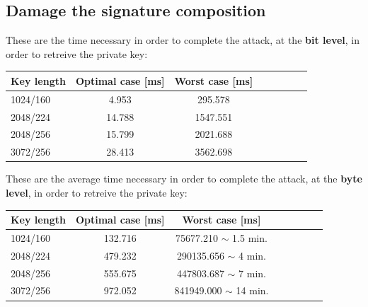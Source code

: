\documentclass[11pt,english]{article}
\begin{document}
\subsection{Damage the signature composition}

These are the time necessary in order to complete the attack, at the \textbf{bit level}, in order to retreive the private key:\\

\begin{center}
\begin{tabular}{l*{6}{c}r}
Key length        & Optimal case [ms] & Worst case [ms] \\
\hline
1024/160 &        4.953 & 295.578  \\
2048/224 &       14.788 & 1547.551  \\
2048/256 &       15.799 & 2021.688  \\
3072/256 &       28.413 & 3562.698 \\ 
\end{tabular}
\end{center}

These are the average time necessary in order to complete the attack, at the \textbf{byte level}, in order to retreive the private key:\\

\begin{center}
\begin{tabular}{l*{6}{c}r}
Key length        & Optimal case [ms] & Worst case [ms] \\
\hline
1024/160 &        132.716 & 75677.210  $\mathtt{\sim}$ 1.5 min.\\
2048/224 &        479.232 & 290135.656 $\mathtt{\sim}$ 4 min. \\
2048/256 &       555.675  & 447803.687 $\mathtt{\sim}$ 7 min.   \\
3072/256 &       972.052 & 841949.000 $\mathtt{\sim}$ 14 min.  \\ 
\end{tabular}
\end{center}
\end{document}
